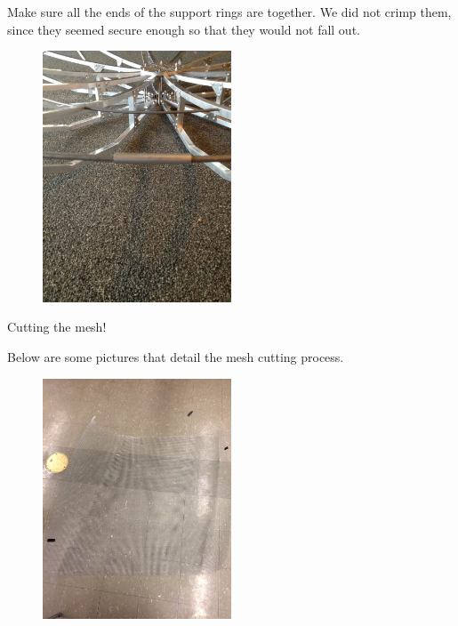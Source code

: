 \documentclass[11pt]{article} %
\begin{document}
Make sure all the ends of the support rings are together. We did not crimp them, since they seemed secure enough so that they would not fall out.

\begin{figure}
  \centering
  \caption{   }
  \includegraphics[width=0.50\textwidth]{dish/07.jpeg}
\end{figure}

Cutting the mesh!

Below are some pictures that detail the mesh cutting process.


\begin{figure}
  \centering
  \caption{   }
  \includegraphics[width=0.50\textwidth]{dish/08.jpeg}
\end{figure}
\end{document}
